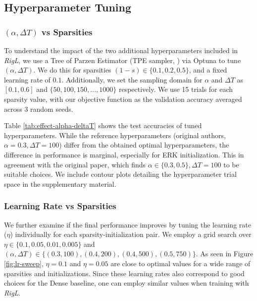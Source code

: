 \subsection{Hyperparameter Tuning}\label{hyperparameter-tuning}



\subsubsection{$(\alpha, \Delta T)$ vs Sparsities} To understand the impact of the two additional hyperparameters included in \textit{RigL}, we use a Tree of Parzen Estimator (TPE sampler, \citet{TPE_Bergstra}) via Optuna to tune $(\alpha, \Delta T)$. We do this for sparsities $(1 - s) \in \{0.1,0.2,0.5\}$, and a fixed learning rate of $0.1$. Additionally, we set the sampling domain for $\alpha$ and $\Delta T$ as $[0.1,0.6]$ and $\{50,100, 150,...,1000\}$ respectively. We use 15 trials for each sparsity value, with our objective function as the validation accuracy averaged across 3 random seeds.



Table \ref{tab:effect-alpha-deltaT} shows the test accuracies of tuned hyperparameters. While the reference hyperparameters (original authors, $\alpha=0.3, \Delta T=100$) differ from the obtained optimal hyperparameters, the difference in performance is marginal, especially for ERK initialization. This in agreement with the original paper, which finds $\alpha \in \{0.3, 0.5\}, \Delta T = 100$ to be suitable choices. We include contour plots detailing the hyperparameter trial space in the supplementary material.

\subsubsection{Learning Rate vs Sparsities} We further examine if the final performance improves by tuning the learning rate ($\eta$) individually for each sparsity-initialization pair. We employ a grid search over $\eta \in \{0.1,0.05,0.01,0.005\}$ and $(\alpha, \Delta T) \in \{(0.3, 100), (0.4,200), (0.4, 500), (0.5, 750)\}$. As seen in Figure \ref{fig:lr-sweep}, $\eta = 0.1$ and $\eta = 0.05$ are close to optimal values for a wide range of sparsities and initializations. Since these learning rates also correspond to good choices for the Dense baseline, one can employ similar values when training with \textit{RigL}.

